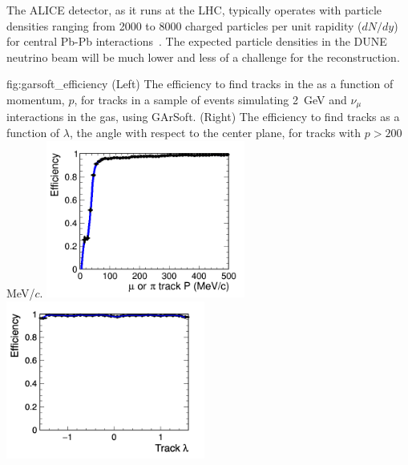 The ALICE detector, as it runs at the LHC, typically operates with particle densities ranging from 2000 to 8000 charged particles per unit rapidity ($dN/dy$) for central Pb-Pb interactions~\cite{Cheshkov:2006ym}. The expected particle densities in the DUNE neutrino beam will be much lower and less of a challenge for the reconstruction. 

\begin{dunefigure}{fig:garsoft_efficiency}
{(Left) The efficiency to find tracks in the  as a function of momentum, $p$, for tracks in a sample of  events simulating \SI{2}{GeV} and $\nu_\mu$ interactions in the gas, using GArSoft. (Right) The efficiency to find tracks as a function of $\lambda$, the angle with respect to the center plane, for tracks with $p>200\,$MeV/$c$.}
    \includegraphics[width=0.49\textwidth]{graphics/effvsp.png}\includegraphics[width=0.49\textwidth]{graphics/effvslambdagt200MeV.png}
\end{dunefigure}

